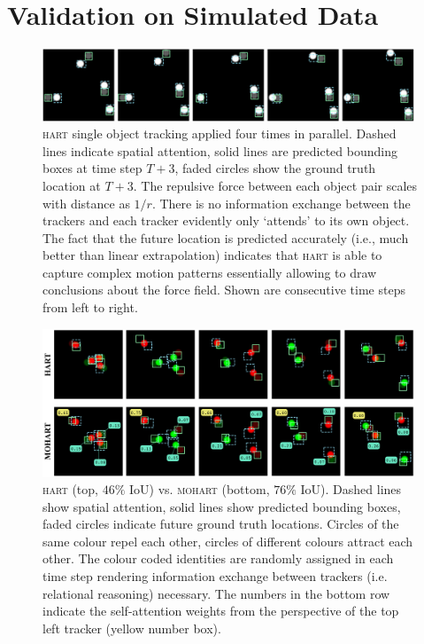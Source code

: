 \section{Validation on Simulated Data} %
\label{sec:mohart_experiment_toy}

\begin{figure}%
    \centering
    \includegraphics[width=0.99\textwidth]{figures/MOHART/sot_protons}
    \caption{\textsc{hart} single object tracking applied four times in parallel. Dashed lines indicate spatial attention, solid lines are predicted bounding boxes at time step $T+3$, faded circles show the ground truth location at $T+3$. The repulsive force between each object pair scales with distance as $1/r$. There is no information exchange between the trackers and each tracker evidently only `attends' to its own object. The fact that the future location is predicted accurately (i.e., much better than linear extrapolation) indicates that \textsc{hart} is able to capture complex motion patterns essentially allowing to draw conclusions about the force field. Shown are consecutive time steps from left to right.
    }
    \label{fig:toy1}
\end{figure} 
\begin{figure}%
    \centering
    \includegraphics[width=0.99\textwidth]{figures/MOHART/mot_proel}
    \caption{\textsc{hart} (top, $46\%$ IoU) vs. \textsc{mohart} (bottom, $76\%$ IoU). Dashed lines show spatial attention, solid lines show predicted bounding boxes, faded circles indicate future ground truth locations. Circles of the same colour repel each other, circles of different colours attract each other. The colour coded identities are randomly assigned in each time step rendering information exchange between trackers (i.e. relational reasoning) necessary. The numbers in the bottom row indicate the self-attention weights from the perspective of the top left tracker (yellow number box).
    }
    \label{fig:toy2}
\end{figure}



